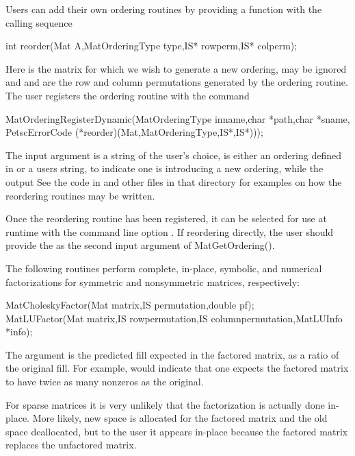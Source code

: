 {{{Users can add their own ordering routines 
by providing a function with the calling sequence
\begin{tabbing}
   int reorder(Mat A,MatOrderingType type,IS* rowperm,IS* colperm);
\end{tabbing}
Here  is the matrix for which we wish to generate a new ordering, 
 may be ignored and  and  are the row
and column permutations generated by the ordering routine.
The user registers the ordering routine
with the command
\begin{tabbing}
  MatOrderingRegisterDynamic(MatOrderingType inname,char *path,char *sname,\\
                             PetscErrorCode (*reorder)(Mat,MatOrderingType,IS*,IS*)));
\end{tabbing}
The   
input argument  is a string of the user's choice,  is either 
an ordering defined in  or a users string,
to indicate one is introducing a new ordering, while the output
See the code in  and other files in that 
directory for examples on how the reordering routines may be written.

Once the reordering routine has been registered,
it can be selected for use at runtime with the
command line option  .  If reordering directly,
the user should provide the  as the second input argument of
MatGetOrdering().

The following routines perform complete, in-place, symbolic, and numerical 
factorizations for symmetric and nonsymmetric matrices, respectively:
\begin{tabbing}
  MatCholeskyFactor(Mat matrix,IS permutation,double pf);\\
  MatLUFactor(Mat matrix,IS rowpermutation,IS columnpermutation,MatLUInfo *info); 
\end{tabbing}
The argument  is the predicted fill
expected in the factored matrix, as a ratio of the original fill. 
For example,  would indicate that one expects the factored
matrix to have twice as many nonzeros as the original.
 

For sparse matrices it is very unlikely that the factorization 
is actually done in-place. More likely, new space is allocated 
for the factored matrix and the old space deallocated, but to the 
user it appears in-place because the factored matrix replaces
the unfactored matrix.

}}}
